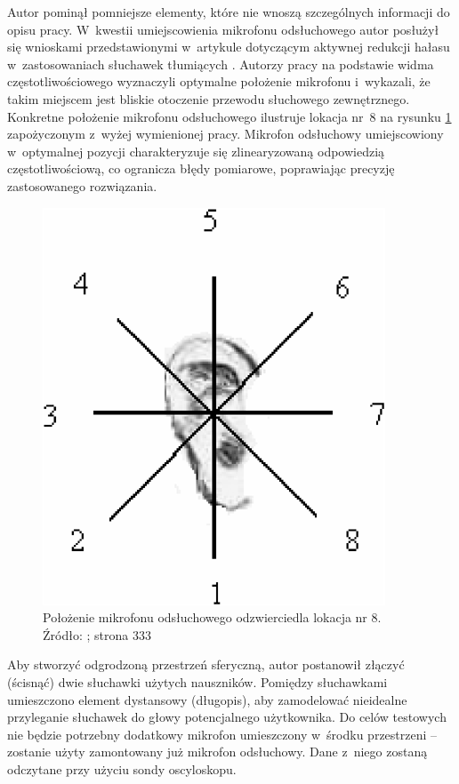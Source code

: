 Autor pominął pomniejsze elementy, które nie wnoszą szczególnych informacji do opisu pracy. W~kwestii umiejscowienia mikrofonu odsłuchowego autor posłużył się wnioskami przedstawionymi w~artykule dotyczącym aktywnej redukcji hałasu w~zastosowaniach słuchawek tłumiących \cite{ANC4HP}. Autorzy pracy na podstawie widma częstotliwościowego wyznaczyli optymalne położenie mikrofonu i~wykazali, że takim miejscem jest bliskie otoczenie przewodu słuchowego zewnętrznego. Konkretne położenie mikrofonu odsłuchowego ilustruje lokacja nr~8 na rysunku \ref{fig:error_mic_placement} zapożyczonym z~wyżej wymienionej pracy.
Mikrofon odsłuchowy umiejscowiony w~optymalnej pozycji charakteryzuje się zlinearyzowaną odpowiedzią częstotliwościową, co ogranicza błędy pomiarowe, poprawiając precyzję zastosowanego rozwiązania.
\begin{figure}[h!]
	\centering
	\includegraphics[scale=0.6]{../Assets/error_mic_placement.png}
	\caption{Położenie mikrofonu odsłuchowego odzwierciedla lokacja nr 8.\\ Źródło: ; strona 333}
	\label{fig:error_mic_placement}
\end{figure}

Aby stworzyć odgrodzoną przestrzeń sferyczną, autor postanowił złączyć (ścisnąć) dwie słuchawki użytych nauszników. Pomiędzy słuchawkami umieszczono element dystansowy (długopis), aby zamodelować nieidealne przyleganie słuchawek do głowy potencjalnego użytkownika. Do celów testowych nie będzie potrzebny dodatkowy mikrofon umieszczony w~środku przestrzeni -- zostanie użyty zamontowany już mikrofon odsłuchowy. Dane z~niego zostaną odczytane przy użyciu sondy oscyloskopu.

